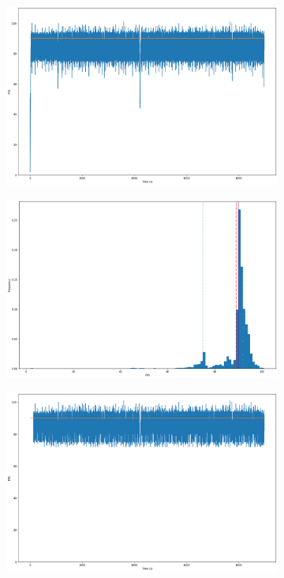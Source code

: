 \begin{figure}[t]
    \centering
    \begin{subfigure}{.45\textwidth}
        \centering
        \includegraphics[width=\textwidth]{pictures/analysis stream tracer 1000/output_5_0.png}
        \caption{}
    \end{subfigure}
    \begin{subfigure}{.45\textwidth}
        \centering
        \includegraphics[width=\textwidth]{pictures/analysis stream tracer 1000/output_6_0.png}
        \caption{}
    \end{subfigure}
    \begin{subfigure}{.45\textwidth}
        \centering
        \includegraphics[width=\textwidth]{pictures/analysis stream tracer 1000/output_13_0.png}

\end{subfigure}
\end{figure}
